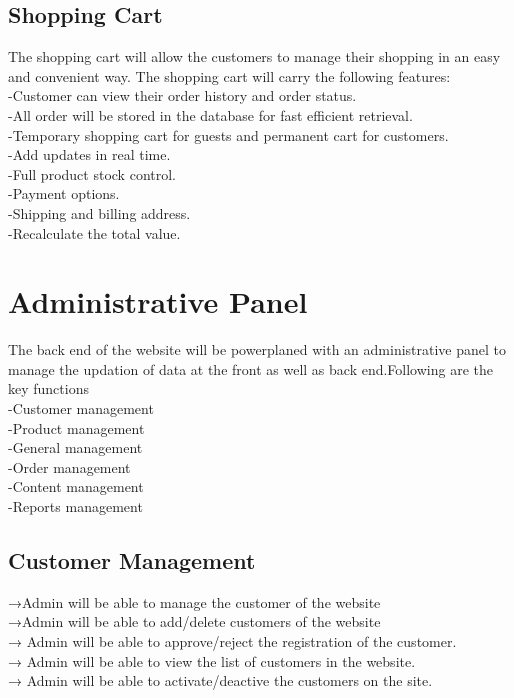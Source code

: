 \documentclass{article}
\begin{document}
\subsection{Shopping Cart}
The shopping cart will allow the customers to manage their
shopping in an easy and convenient way. The shopping cart will
carry the following features:\\
-Customer can view their order history and order status.\\
-All order will be stored in the database for fast efficient retrieval.\\
-Temporary shopping cart for guests and permanent cart for
customers.\\
-Add updates in real time.\\
-Full product stock control.\\
-Payment options.\\
-Shipping and billing address.\\
-Recalculate the total value.\\





\section{Administrative Panel}
The back end of the website will be powerplaned with an
administrative panel to manage the updation of data at the front as
well as back end.Following are the key functions\\
-Customer management\\
-Product management\\
-General management\\
-Order management\\
-Content management\\
-Reports management\\


\subsection{Customer Management}
 
→Admin will be able to manage the customer of the website\\
→Admin will be able to add/delete customers of the website\\
→ Admin will be able to approve/reject the registration of the
customer.\\
→ Admin will be able to view the list of customers in the website.\\
→ Admin will be able to activate/deactive the customers on the
site.\\
\end{document}
